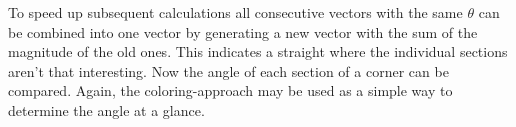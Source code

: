 To speed up subsequent calculations all consecutive vectors with the same $\theta$ can be combined into one vector by generating a new vector with the sum of the magnitude of the old ones. This indicates a straight where the individual sections aren't that interesting.
Now the angle of each section of a corner can be compared. Again, the coloring-approach may be used as a simple way to determine the angle at a glance.
\clearpage
